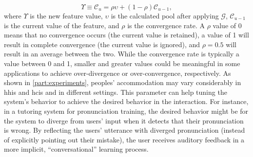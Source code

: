 %
\begin{equation}
	\Upsilon \equiv \mathcal{C}_u = \rho \upsilon + \left(1 - \rho \right) \mathcal{C}_{u-1},
	\label{eq:convergence_rate}
\end{equation}
\noindent
%
where $\Upsilon$ is the new feature value, $\upsilon$ is the calculated pool after applying $\mathcal{G}$, $\mathcal{C}_{u-1}$ is the current value of the feature, and $\rho$ is the convergence rate.
A $\rho$ value of 0 means that no convergence occurs (the current value is retained), a value of 1 will result in complete convergence (the current value is ignored), and $\rho=0.5$ will result in an average between the two.
While the convergence rate is typically a value between 0 and 1, smaller and greater values could be meaningful in some applications to achieve over-divergence or over-convergence, respectively.
As shown in \cref{part:experiments}, peoples' accommodation may vary considerably in \acp{hhi} and \acp{hci} and in different settings.
This parameter can help tuning the system's behavior to achieve the desired behavior in the interaction.
For instance, in a tutoring system for pronunciation training, the desired behavior might be for the system to diverge from users' input when it detects that their pronunciation is wrong.
By reflecting the users' utterance with diverged pronunciation (instead of explicitly pointing out their mistake), the user receives auditory feedback in a more implicit, \enquote{conversational} learning process.

%

